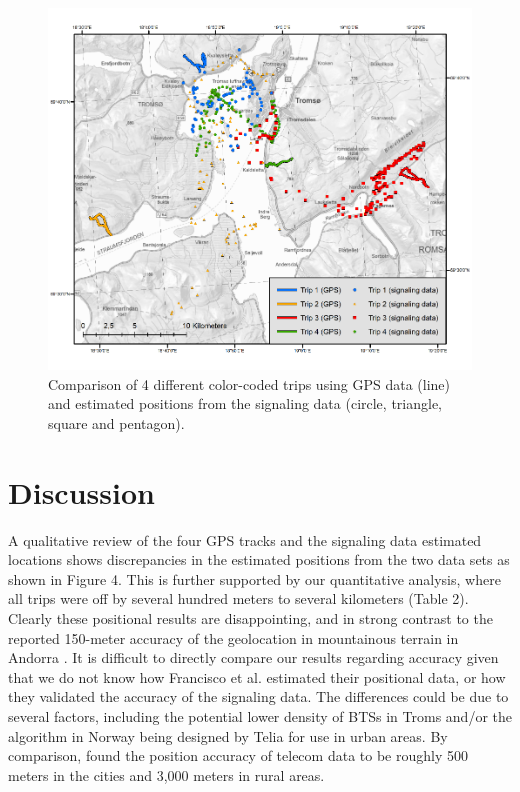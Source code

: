 \documentclass[authordate,empirical]{jote-new-article}
\begin{document}
\begin{figure}[b]
  \begin{fullwidth}



    \centering
    \includegraphics[width=.9\linewidth]{media/image5.png}
    \caption{Comparison of 4 different color-coded trips using GPS data (line) and estimated positions from the signaling data (circle, triangle, square and pentagon).}
    \label{fig:rId12}

  \end{fullwidth}
\end{figure}





\section{Discussion}



A qualitative review of the four GPS tracks and the signaling data estimated locations shows discrepancies in the estimated positions from the two data sets as shown in Figure 4. This is further supported by our quantitative analysis, where all trips were off by several hundred meters to several kilometers (Table 2). Clearly these positional results are disappointing, and in strong contrast to the reported 150-meter accuracy of the geolocation in mountainous terrain in Andorra \parencites{Francisco2018}. It is difficult to directly compare our results regarding accuracy given that we do not know how Francisco et al. estimated their positional data, or how they validated the accuracy of the signaling data. The differences could be due to several factors, including the potential lower density of BTSs in Troms and/or the algorithm in Norway being designed by Telia for use in urban areas. By comparison, \textcite{Jansen2021} found the position accuracy of telecom data to be roughly 500 meters in the cities and 3,000 meters in rural areas.
\end{document}

